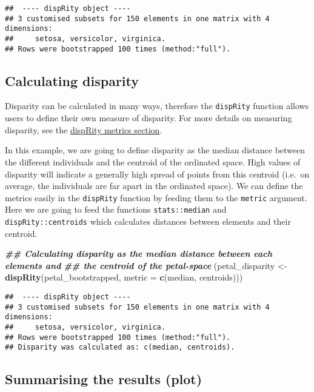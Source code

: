 \documentclass[
]{book}
\newenvironment{Shaded}{\begin{snugshade}}{\end{snugshade}}
\newcommand{\AttributeTok}[1]{\textcolor[rgb]{0.13,0.29,0.53}{#1}}
\newcommand{\DocumentationTok}[1]{\textcolor[rgb]{0.56,0.35,0.01}{\textbf{\textit{#1}}}}
\newcommand{\FunctionTok}[1]{\textcolor[rgb]{0.13,0.29,0.53}{\textbf{#1}}}
\newcommand{\NormalTok}[1]{#1}
\newcommand{\OtherTok}[1]{\textcolor[rgb]{0.56,0.35,0.01}{#1}}
\begin{document}
\begin{verbatim}
##  ---- dispRity object ---- 
## 3 customised subsets for 150 elements in one matrix with 4 dimensions:
##     setosa, versicolor, virginica.
## Rows were bootstrapped 100 times (method:"full").
\end{verbatim}

\hypertarget{calculating-disparity}{%
\subsection{Calculating disparity}\label{calculating-disparity}}

Disparity can be calculated in many ways, therefore the \texttt{dispRity} function allows users to define their own measure of disparity.
For more details on measuring disparity, see the \protect\hyperlink{disparity-metrics}{dispRity metrics section}.

In this example, we are going to define disparity as the median distance between the different individuals and the centroid of the ordinated space.
High values of disparity will indicate a generally high spread of points from this centroid (i.e.~on average, the individuals are far apart in the ordinated space).
We can define the metrics easily in the \texttt{dispRity} function by feeding them to the \texttt{metric} argument.
Here we are going to feed the functions \texttt{stats::median} and \texttt{dispRity::centroids} which calculates distances between elements and their centroid.

\begin{Shaded}
\begin{Highlighting}[]
\DocumentationTok{\#\# Calculating disparity as the median distance between each elements and}
\DocumentationTok{\#\# the centroid of the petal{-}space}
\NormalTok{(petal\_disparity }\OtherTok{\textless{}{-}} \FunctionTok{dispRity}\NormalTok{(petal\_bootstrapped, }\AttributeTok{metric =} \FunctionTok{c}\NormalTok{(median, centroids)))}
\end{Highlighting}
\end{Shaded}

\begin{verbatim}
##  ---- dispRity object ---- 
## 3 customised subsets for 150 elements in one matrix with 4 dimensions:
##     setosa, versicolor, virginica.
## Rows were bootstrapped 100 times (method:"full").
## Disparity was calculated as: c(median, centroids).
\end{verbatim}

\hypertarget{summarising-the-results-plot}{%
\subsection{Summarising the results (plot)}\label{summarising-the-results-plot}}
\end{document}
